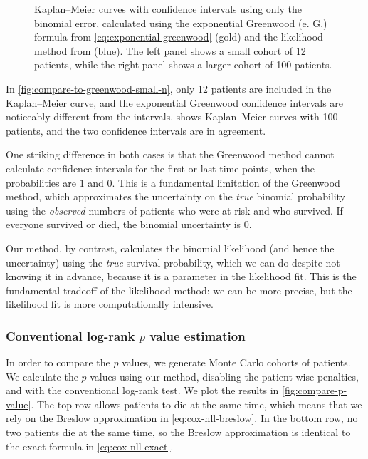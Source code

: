\documentclass[article]{jss}
\newcommand{\KM}{Kaplan--Meier} %
\begin{document}
\begin{figure}
\begin{subfigure}[t]{0.49\textwidth}
  \caption{\label{fig:compare-to-greenwood-large-n}}
\end{subfigure}
\caption{\label{fig:compare-to-greenwood} \KM{} curves with confidence intervals using only the binomial error, calculated using the exponential Greenwood (e. G.) formula from \cref{eq:exponential-greenwood} (gold) and the likelihood method from  (blue). The left panel shows a small cohort of 12 patients, while the right panel shows a larger cohort of 100 patients.}
\end{figure}

In \cref{fig:compare-to-greenwood-small-n}, only 12 patients are included in the \KM{} curve, and the exponential Greenwood confidence intervals are noticeably different from the  intervals.  shows \KM{} curves with 100 patients, and the two confidence intervals are in agreement.

One striking difference in both cases is that the Greenwood method cannot calculate confidence intervals for the first or last time points, when the probabilities are \(1\) and \(0\). This is a fundamental limitation of the Greenwood method, which approximates the uncertainty on the \emph{true} binomial probability using the \emph{observed} numbers of patients who were at risk and who survived. If everyone survived or died, the binomial uncertainty is \(0\).

Our method, by contrast, calculates the binomial likelihood (and hence the uncertainty) using the \emph{true} survival probability, which we can do despite not knowing it in advance, because it is a parameter in the likelihood fit. This is the fundamental tradeoff of the likelihood method: we can be more precise, but the likelihood fit is more computationally intensive.

\subsubsection[Conventional log-rank p value estimation]{Conventional log-rank \(p\) value estimation}\label{sec:compare-to-conventional-p-value}

In order to compare the \(p\) values, we generate Monte Carlo cohorts of patients. We calculate the \(p\) values using our method, disabling the patient-wise penalties, and with the conventional log-rank test. We plot the results in \cref{fig:compare-p-value}. The top row allows patients to die at the same time, which means that we rely on the Breslow approximation in \cref{eq:cox-nll-breslow}. In the bottom row, no two patients die at the same time, so the Breslow approximation is identical to the exact formula in \cref{eq:cox-nll-exact}.
\end{document}
